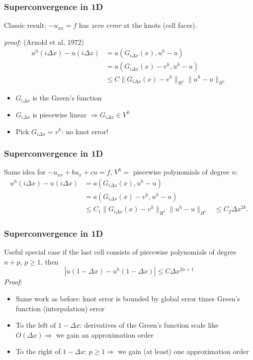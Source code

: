 \begin{frame}
    \frametitle{Superconvergence in 1D}
    Classic result: \(-u_{xx} = f\) has \emph{zero error} at the knots (cell faces).
    \pause

    \emph{proof:} (Arnold et al, 1972)
    \begin{align*}
        u^h(i \Delta x) - u(i \Delta x)
        &= a(G_{i\Delta x}(x), u^h - u)                                       \\
        &= a(G_{i\Delta x}(x) - v^h, u^h - u)                                 \\
        &\leq C \|G_{i\Delta x}(x) - v^h\|_{H^1} \|u^h - u\|_{H^1}
    \end{align*}
    \pause
    \begin{itemize}
        \item \(G_{i\Delta x}\) is the Green's function
        \item \(G_{i \Delta x}\) is piecewise linear
              \(\Rightarrow G_{i\Delta x} \in V^h\)
        \item Pick \(G_{i\Delta x} = v^h\): no knot error!
    \end{itemize}
\end{frame}

\begin{frame}
    \frametitle{Superconvergence in 1D}
    Same idea for \(-u_{xx} + b u_x + c u = f\), \(V^h =\) piecewise
    polynomials of degree \(n\):
    \pause
    \begin{align*}
        u^h(i \Delta x) - u(i \Delta x)
        &= a(G_{i\Delta x}(x), u^h - u)                                       \\
        &= a(G_{i\Delta x}(x) - v^h, u^h - u)                                 \\
        &\leq C_1 \|G_{i\Delta x}(x) - v^h\|_{H^1} \|u^h - u\|_{H^1}
        &\leq C_2 \Delta x^{2 k}.
    \end{align*}
\end{frame}

\begin{frame}
    \frametitle{Superconvergence in 1D}
    Useful special case if the last cell consists of piecewise polynomials of
    degree \(n + p\), \(p \geq 1\), then
    \begin{equation}
        |u(1 - \Delta x) - u^h(1 - \Delta x)| \leq C \Delta x^{2 n + 1}
    \end{equation}
    \pause
    \emph{Proof}:
    \begin{itemize}
        \item Same work as before: knot error is bounded by global error times
              Green's function (interpolation) error
        \item To the left of \(1 - \Delta x\): derivatives of the Green's
              function scale like \(O(\Delta x) \Rightarrow\) we gain an
              approximation order
        \item To the right of \(1 - \Delta x\): \(p \geq 1 \Rightarrow\) we gain
              (at least) one approximation order
    \end{itemize}
\end{frame}

